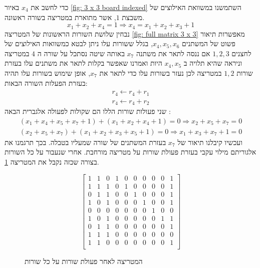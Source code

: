 \documentclass[12pt,leqno]{article}
\theoremstyle{theoremdd}
\begin{document}
כדי לחשב את 
$x_4$
באיור
\ref{fig: 3 x 3 board indexed}
השתמשנו במשוואת האילוצים של 
משבצת 
$1$,
אשר מתוארת במטריצה בשורה ראשונה.
\[
    x_1 + x_2 + x_4 = 1 \Rightarrow x_4 = x_1 + x_2 + x_3 + 1
\]
נבחין שלושת השורות הראשונות  
של המטריצה 
\ref{fig: full matrix 3 x 3}
מאפשרות תיאור פשוט של המשתנים 
$x_4, x_5, x_6$,
בגלל ששורות עלו ניתן לבטא כמשוואות האילוצים של לחצנים 
$1,2,3$
אם ננסה לתאר 
את משתנה 
$x_7$
באותה שיטה 
נסתכל על שורה ה 
$4$
במטריצה 
וניראה שהיא תלויה ב
$x_4, x_5$
היות ואמרנו
שאפשר בקלות לתאר את משתנים עלו 
בעזרת שורות 
$1,2$
במטריצה לכן 
נעזר בשורות עלו כדי לתאר את 
$x_7$,
אופן שימוש בשורות עלו תהיה בעזרת
הפעלות השורה הבאות:
\begin{align*}
    r_4 \leftarrow r_4 + r_1
    \\
    r_4 \leftarrow r_4 + r_2
\end{align*}
שני פעולות שורות הללו הם שקולות לפעולה אלגברית הבאה
:
\begin{align*}
   (x_1 + x_4 + x_5 + x_7 + 1) + (x_1 + x_2 + x_4 + 1) = 0 \Rightarrow x_2 + x_5 + x_7 = 0
    \\
    (x_2 + x_5 + x_7) + (x_1 + x_2 + x_3 + x_5 + 1 ) = 0 \Rightarrow x_1 + x_3 + x_7 + 1 = 0
\end{align*}
ועכשיו קיבלנו תיאור 
של 
$x_7$
בעזרת המשתנים של שורה שמעליו בטבלה.
בכך תרגמנו את אלגוריתם מילוי עקבי בעזרת פעולת שורות על מטריצה מורחבת.
אחרי שנעבור על כל השורות בצורה שכזה נקבל את המטריצה
\ref{fig: matrix after spanish}.

\begin{figure}[ht]
    \caption{המטריצה לאחר פעולת שורות על כל שורות}
    \label{fig: matrix after spanish}
    \begin{english}
        \begin{center}
            \[
                \left[
                \begin{array}{ccccccccc|c}
                1& 1& 0& 1& 0& 0& 0& 0& 0& 1 \\
                1& 1& 1& 0& 1& 0& 0& 0& 0& 1 \\
                0& 1& 1& 0& 0& 1& 0& 0& 0& 1 \\
                1& 0& 1& 0& 0& 0& 1& 0& 0& 1\\
                0& 0& 0& 0& 0& 0& 0& 1& 0& 0\\
                1& 0& 1& 0& 0& 0& 0& 0& 1& 1\\
                0& 1& 1& 0& 0& 0& 0& 0& 0& 1\\
                1& 1& 1& 0& 0& 0& 0& 0& 0& 0\\
                1& 1& 0& 0& 0& 0& 0& 0& 0& 1\\
            \end{array}
            \right]
            \]
        \end{center}       
    \end{english}
\end{figure}
\end{document}
